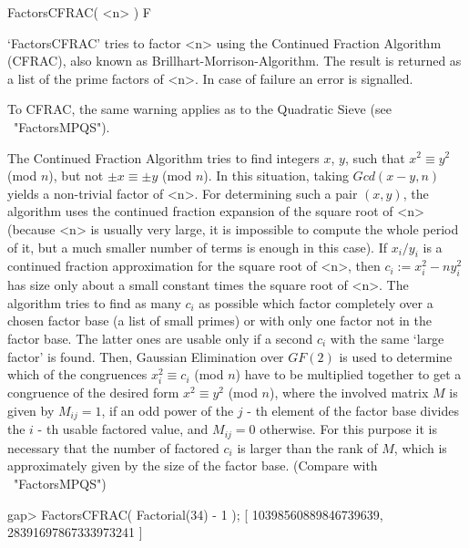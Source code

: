 
\>FactorsCFRAC( <n> ) F

`FactorsCFRAC' tries to factor <n> using the Continued Fraction
Algorithm (CFRAC), also known as Brillhart-Morrison-Algorithm. 
The result is returned as a list of the prime factors of <n>.
In case of failure an error is signalled.

To CFRAC, the same warning applies 
as to the Quadratic Sieve (see ~"FactorsMPQS").

The Continued Fraction Algorithm tries to find integers $x$, $y$,
such that $x^2 \equiv y^2$ (mod $n$), but not $\pm x \equiv \pm y$
(mod $n$). In this situation, taking $Gcd(x - y,n)$ yields a 
non-trivial factor of <n>. For determining such a pair $(x,y)$, 
the algorithm uses the continued fraction expansion of the square root
of <n> (because <n> is usually very large, it is impossible to compute
the whole period of it, but a much smaller number of terms is enough
in this case). If $x_i/y_i$ is a
continued fraction approximation for the square root of <n>,
then $c_i := x_i^2 - ny_i^2$ has size only about a small constant times
the square root of <n>.
The algorithm tries to find as many $c_i$ as possible which factor 
completely over a chosen factor base 
(a list of small primes) or with only one factor not in the factor base.
The latter ones are usable only if a second $c_i$ with the same
\lq large factor' is found.
Then,  Gaussian Elimination over $GF(2)$ 
is used to determine which of the congruences $x_i^2 \equiv c_i$
(mod $n$) have to be multiplied together to get a congruence
of the desired form  $x^2 \equiv y^2$ (mod $n$), where the involved
matrix $M$ is given by $M_{ij} = 1$, if an odd power of the $j$ - th
element of the factor base divides the $i$ - th usable factored
value, and $M_{ij} = 0$ otherwise.
For this purpose it is necessary that the number of factored 
$c_i$ is larger than the rank of $M$, which is approximately given by
the size of the factor base.
(Compare with ~"FactorsMPQS")

\beginexample
gap> FactorsCFRAC( Factorial(34) - 1 );
[ 10398560889846739639, 28391697867333973241 ]
\endexample



